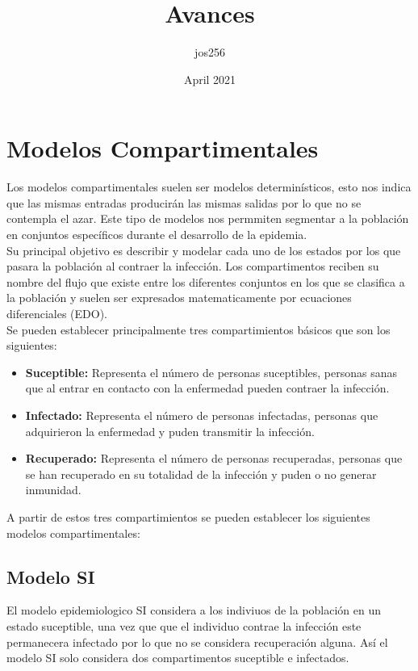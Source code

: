 \documentclass[a4paper,openright,12pt]{book}
\title{Avances}
\author{jos256 }
\date{April 2021}
\begin{document}
\chapter{Modelos Compartimentales}

Los modelos compartimentales suelen ser modelos determinísticos, esto nos indica que las mismas entradas producirán las mismas salidas por lo que no se contempla el azar. Este tipo de modelos nos permmiten segmentar a la población en conjuntos específicos durante el desarrollo de la epidemia. \\

Su principal objetivo es describir y modelar cada uno de los estados por los que pasara la población al contraer la infección.
Los compartimentos reciben su nombre del flujo que existe entre los diferentes conjuntos en los que se clasifica a la población y suelen ser expresados matematicamente por ecuaciones diferenciales (EDO).\\

Se pueden establecer principalmente tres compartimientos básicos que son los siguientes:\\

\begin{itemize}
\item \textbf{Suceptible:} Representa el número de personas suceptibles, personas sanas que al entrar en contacto con la enfermedad pueden contraer la infección.\\

\item \textbf{Infectado:} Representa el número de personas infectadas, personas que adquirieron la enfermedad y puden transmitir la infección.\\

\item \textbf{Recuperado:} Representa el número de personas recuperadas, personas que se han recuperado en su totalidad de la infección y puden o no generar inmunidad.
\end{itemize}

A partir de estos tres compartimientos se pueden establecer los siguientes modelos compartimentales:

\section{Modelo SI}

El modelo epidemiologico SI considera a los indiviuos de la población en un estado suceptible, una vez que que el individuo contrae la infección este permanecera infectado por lo que no se considera recuperación alguna. Así el modelo SI solo considera dos compartimentos suceptible e infectados.\\ 
\end{document}
